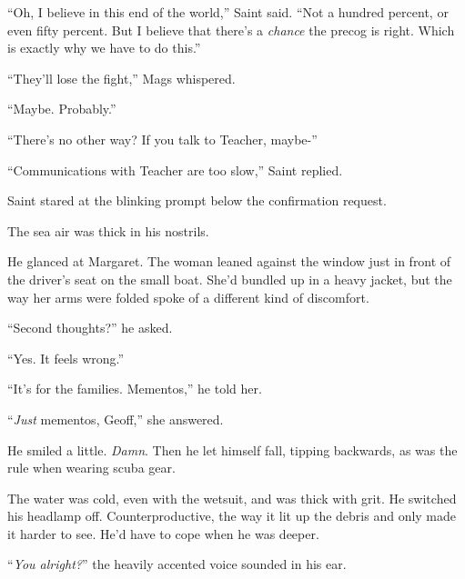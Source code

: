 ``Oh, I believe in this end of the world,'' Saint said.  ``Not a hundred percent, or even fifty percent.  But I believe that there's a \emph{chance} the precog is right.  Which is exactly why we have to do this.''



``They'll lose the fight,'' Mags whispered.



``Maybe.  Probably.''



``There's no other way?  If you talk to Teacher, maybe-''



``Communications with Teacher are too slow,'' Saint replied.



Saint stared at the blinking prompt below the confirmation request.



\sectionbreak



The sea air was thick in his nostrils.



He glanced at Margaret.  The woman leaned against the window just in front of the driver's seat on the small boat.  She'd bundled up in a heavy jacket, but the way her arms were folded spoke of a different kind of discomfort.



``Second thoughts?'' he asked.



``Yes.  It feels wrong.''



``It's for the families.  Mementos,'' he told her.



``\emph{Just} mementos, Geoff,'' she answered.



He smiled a little.  \emph{Damn}.  Then he let himself fall, tipping backwards, as was the rule when wearing scuba gear.



The water was cold, even with the wetsuit, and was thick with grit.  He switched his headlamp off.  Counterproductive, the way it lit up the debris and only made it harder to see.  He'd have to cope when he was deeper.



``\emph{You alright?}'' the heavily accented voice sounded in his ear.



